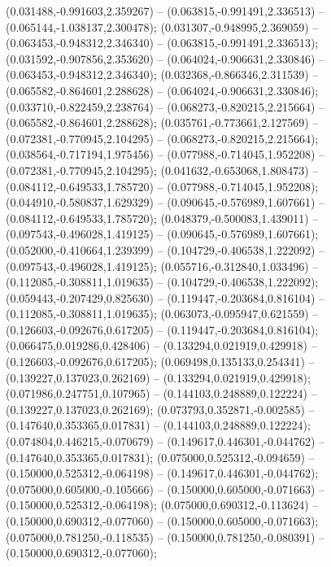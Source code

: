  (0.031488,-0.991603,2.359267) -- (0.063815,-0.991491,2.336513) -- (0.065144,-1.038137,2.300478);
 (0.031307,-0.948995,2.369059) -- (0.063453,-0.948312,2.346340) -- (0.063815,-0.991491,2.336513);
 (0.031592,-0.907856,2.353620) -- (0.064024,-0.906631,2.330846) -- (0.063453,-0.948312,2.346340);
 (0.032368,-0.866346,2.311539) -- (0.065582,-0.864601,2.288628) -- (0.064024,-0.906631,2.330846);
 (0.033710,-0.822459,2.238764) -- (0.068273,-0.820215,2.215664) -- (0.065582,-0.864601,2.288628);
 (0.035761,-0.773661,2.127569) -- (0.072381,-0.770945,2.104295) -- (0.068273,-0.820215,2.215664);
 (0.038564,-0.717194,1.975456) -- (0.077988,-0.714045,1.952208) -- (0.072381,-0.770945,2.104295);
 (0.041632,-0.653068,1.808473) -- (0.084112,-0.649533,1.785720) -- (0.077988,-0.714045,1.952208);
 (0.044910,-0.580837,1.629329) -- (0.090645,-0.576989,1.607661) -- (0.084112,-0.649533,1.785720);
 (0.048379,-0.500083,1.439011) -- (0.097543,-0.496028,1.419125) -- (0.090645,-0.576989,1.607661);
 (0.052000,-0.410664,1.239399) -- (0.104729,-0.406538,1.222092) -- (0.097543,-0.496028,1.419125);
 (0.055716,-0.312840,1.033496) -- (0.112085,-0.308811,1.019635) -- (0.104729,-0.406538,1.222092);
 (0.059443,-0.207429,0.825630) -- (0.119447,-0.203684,0.816104) -- (0.112085,-0.308811,1.019635);
 (0.063073,-0.095947,0.621559) -- (0.126603,-0.092676,0.617205) -- (0.119447,-0.203684,0.816104);
 (0.066475,0.019286,0.428406) -- (0.133294,0.021919,0.429918) -- (0.126603,-0.092676,0.617205);
 (0.069498,0.135133,0.254341) -- (0.139227,0.137023,0.262169) -- (0.133294,0.021919,0.429918);
 (0.071986,0.247751,0.107965) -- (0.144103,0.248889,0.122224) -- (0.139227,0.137023,0.262169);
 (0.073793,0.352871,-0.002585) -- (0.147640,0.353365,0.017831) -- (0.144103,0.248889,0.122224);
 (0.074804,0.446215,-0.070679) -- (0.149617,0.446301,-0.044762) -- (0.147640,0.353365,0.017831);
 (0.075000,0.525312,-0.094659) -- (0.150000,0.525312,-0.064198) -- (0.149617,0.446301,-0.044762);
 (0.075000,0.605000,-0.105666) -- (0.150000,0.605000,-0.071663) -- (0.150000,0.525312,-0.064198);
 (0.075000,0.690312,-0.113624) -- (0.150000,0.690312,-0.077060) -- (0.150000,0.605000,-0.071663);
 (0.075000,0.781250,-0.118535) -- (0.150000,0.781250,-0.080391) -- (0.150000,0.690312,-0.077060);
